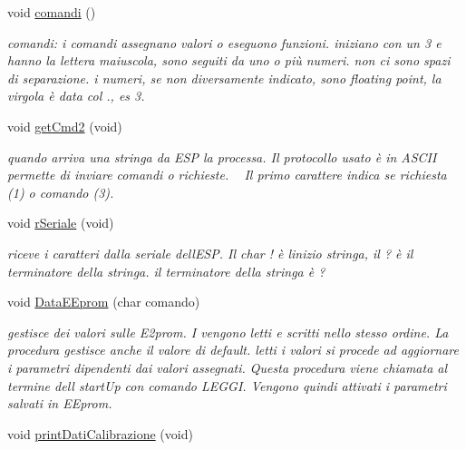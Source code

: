 \begin{DoxyCompactItemize}
\item 
void \mbox{\hyperlink{ari_pi__2_d_c__esp__08_8ino_a8865513d32ebc241dbe80e5bf49ff775}{comandi}} ()
\begin{DoxyCompactList}\small\item\em comandi\+: i comandi assegnano valori o eseguono funzioni. iniziano con un 3 e hanno la lettera maiuscola, sono seguiti da uno o più numeri. non ci sono spazi di separazione. i numeri, se non diversamente indicato, sono floating point, la virgola è data col \textquotesingle{}.\textquotesingle{}, es 3. \end{DoxyCompactList}\item 
void \mbox{\hyperlink{ari_pi__2_d_c__esp__08_8ino_a64ea2b252b5ab59be204f70e2206ce1c}{get\+Cmd2}} (void)
\begin{DoxyCompactList}\small\item\em quando arriva una stringa da E\+SP la processa. Il protocollo usato è in A\+S\+C\+II permette di inviare comandi o richieste. ~\newline
 Il primo carattere indica se richiesta (1) o comando (3). \end{DoxyCompactList}\item 
void \mbox{\hyperlink{ari_pi__2_d_c__esp__08_8ino_ae29b9282fc7ede860a2bb8984ad0560c}{r\+Seriale}} (void)
\begin{DoxyCompactList}\small\item\em riceve i caratteri dalla seriale dell\textquotesingle{}E\+SP. Il char \textquotesingle{}!\textquotesingle{} è l\textquotesingle{}inizio stringa, il \textquotesingle{}?\textquotesingle{} è il terminatore della stringa. il terminatore della stringa è ? \end{DoxyCompactList}\item 
void \mbox{\hyperlink{ari_pi__2_d_c__esp__08_8ino_a24f4d37ce4673eadaa4043cf6ecaff27}{Data\+E\+Eprom}} (char comando)
\begin{DoxyCompactList}\small\item\em gestisce dei valori sulle E2prom. I vengono letti e scritti nello stesso ordine. La procedura gestisce anche il valore di default. letti i valori si procede ad aggiornare i parametri dipendenti dai valori assegnati. Questa procedura viene chiamata al termine dell\textquotesingle{} start\+Up con comando L\+E\+G\+GI. Vengono quindi attivati i parametri salvati in E\+Eprom. \end{DoxyCompactList}\item 
void \mbox{\hyperlink{ari_pi__2_d_c__esp__08_8ino_abbdedc0823a18fd32dee96e0acad447e}{print\+Dati\+Calibrazione}} (void)

\end{DoxyCompactItemize}
